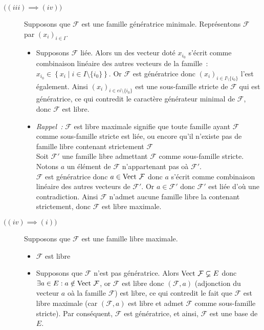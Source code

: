 \documentclass{article}
\begin{document}
\begin{question_kholle}
\begin{description}
		\item[$\bigl((iii) \implies (iv)\bigr)$] Supposons que $\mathcal{F}$ est une famille génératrice minimale. Représentons $\mathcal{F}$ par $(x_{i})_{i\in I}$.
		      \begin{itemize}
			      \item Supposons $\mathcal{F}$ liée. Alors un des vecteur doté $x_{i_{0}}$ s’écrit comme combinaison linéaire des autres vecteurs de la famille~: $x_{i_{0}} \in \left\{x_{i} \mid i\in I\setminus \{i_{0}\}\right\}$. Or $\mathcal{F}$ est génératrice donc $(x_{i})_{i\in I\setminus \{i_{0}\}}$ l’est également. Ainsi $(x_{i})_{i\in ei\setminus \{i_{0}\}}$ est une sous-famille stricte de $\mathcal{F}$ qui est génératrice, ce qui contredit le caractère générateur minimal de $\mathcal{F}$, donc $\mathcal{F}$ est libre.
			      \item \textit{Rappel~:} $\mathcal{F}$ est libre maximale signifie que toute famille ayant $\mathcal{F}$ comme sous-famille stricte est liée, ou encore qu’il n’existe pas de famille libre contenant strictement $\mathcal{F}$\\[4pt]
			            Soit $\mathcal{F'}$ une famille libre admettant $\mathcal{F}$ comme sous-famille stricte. Notons $a$ un élément de $\mathcal{F}$ n’appartenant pas oà $\mathcal{F'}$.\\
			            $\mathcal{F}$ est génératrice donc $a\in\text{Vect }\mathcal{F}$ donc $a$ s’écrit comme combinaison linéaire des autres vecteurs de $\mathcal{F'}$. Or $a\in \mathcal{F'}$ donc $\mathcal{F'}$ est liée d’où une contradiction. Ainsi $\mathcal{F}$ n’admet aucune famille libre la contenant strictement, donc $\mathcal{F}$ est libre maximale.
		      \end{itemize}

		\item[$\bigl((iv) \implies (i)\bigr)$] Supposons que $\mathcal{F}$ est une famille libre maximale.
		      \begin{itemize}
			      \item $\mathcal{F}$ est libre
			      \item Supposons que $\mathcal{F}$ n’est pas génératrice. Alors $\text{Vect }\mathcal{F} \varsubsetneq E$ donc $\exists a\in E: a\notin \text{Vect } \mathcal{F}$, or $\mathcal{F}$ est libre donc $(\mathcal{F}, a)$ (adjonction du vecteur $a$ oà la famille $\mathcal{F}$) est libre, ce qui contredit le fait que $\mathcal{F}$ est libre maximale (car $(\mathcal{F}, a)$ est libre et admet $\mathcal{F}$ comme sous-famille stricte). Par conséquent, $\mathcal{F}$ est génératrice, et ainsi, $\mathcal{F}$ est une base de $E$.
		      \end{itemize}


	\end{description}
\end{question_kholle}
\end{document}
